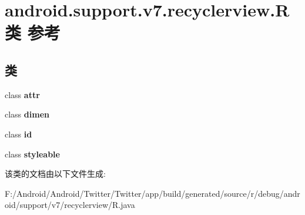 \hypertarget{classandroid_1_1support_1_1v7_1_1recyclerview_1_1_r}{}\section{android.\+support.\+v7.\+recyclerview.\+R类 参考}
\label{classandroid_1_1support_1_1v7_1_1recyclerview_1_1_r}
\subsection*{类}
\begin{DoxyCompactItemize}
\item 
class {\bfseries attr}
\item 
class {\bfseries dimen}
\item 
class {\bfseries id}
\item 
class {\bfseries styleable}
\end{DoxyCompactItemize}


该类的文档由以下文件生成\+:\begin{DoxyCompactItemize}
\item 
F\+:/\+Android/\+Android/\+Twitter/\+Twitter/app/build/generated/source/r/debug/android/support/v7/recyclerview/R.\+java\end{DoxyCompactItemize}
